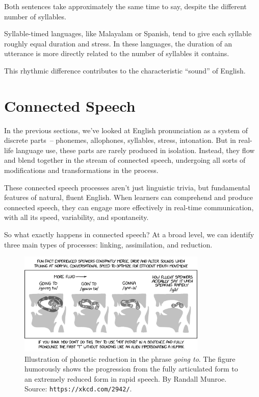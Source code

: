 Both sentences take approximately the same time to say, despite the different number of syllables.

Syllable-timed languages, like Malayalam or Spanish, tend to give each syllable roughly equal duration and stress. In these languages, the duration of an utterance is more directly related to the number of syllables it contains.

This rhythmic difference contributes to the characteristic ``sound'' of English.

\section{Connected Speech}

In the previous sections, we've looked at English pronunciation as a system of discrete parts~-- phonemes, allophones, syllables, stress, intonation. But in real-life language use, these parts are rarely produced in isolation. Instead, they flow and blend together in the stream of connected speech, undergoing all sorts of modifications and transformations in the process.

These connected speech processes aren't just linguistic trivia, but fundamental features of natural, fluent English. When learners can comprehend and produce connected speech, they can engage more effectively in real-time communication, with all its speed, variability, and spontaneity.

So what exactly happens in connected speech? At a broad level, we can identify three main types of processes: linking, assimilation, and reduction.

\begin{figure}[ht]
    \centering
    \includegraphics[width=0.8\textwidth]{figures/fluid_speech_2x.png}
    \caption{Illustration of phonetic reduction in the phrase \textit{going to}. The figure humorously shows the progression from the fully articulated form to an extremely reduced form in rapid speech. By Randall Munroe. Source: \texttt{https://xkcd.com/2942/}.}
    \label{fig:phonetic_reduction}
\end{figure}

